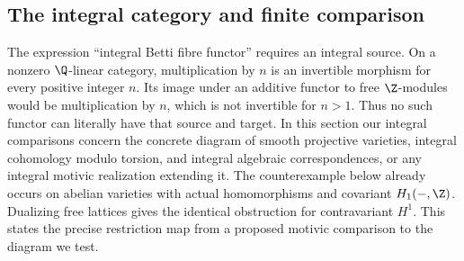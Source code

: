 \subsection{The integral category and finite comparison}

The expression ``integral Betti fibre functor'' requires an integral source. On a nonzero $\Q$-linear category, multiplication by $n$ is an invertible morphism for every positive integer $n$. Its image under an additive functor to free $\Z$-modules would be multiplication by $n$, which is not invertible for $n>1$. Thus no such functor can literally have that source and target. In this section our integral comparisons concern the concrete diagram of smooth projective varieties, integral cohomology modulo torsion, and integral algebraic correspondences, or any integral motivic realization extending it. The counterexample below already occurs on abelian varieties with actual homomorphisms and covariant $H_1(-,\Z)$. Dualizing free lattices gives the identical obstruction for contravariant $H^1$. This states the precise restriction map from a proposed motivic comparison to the diagram we test.

